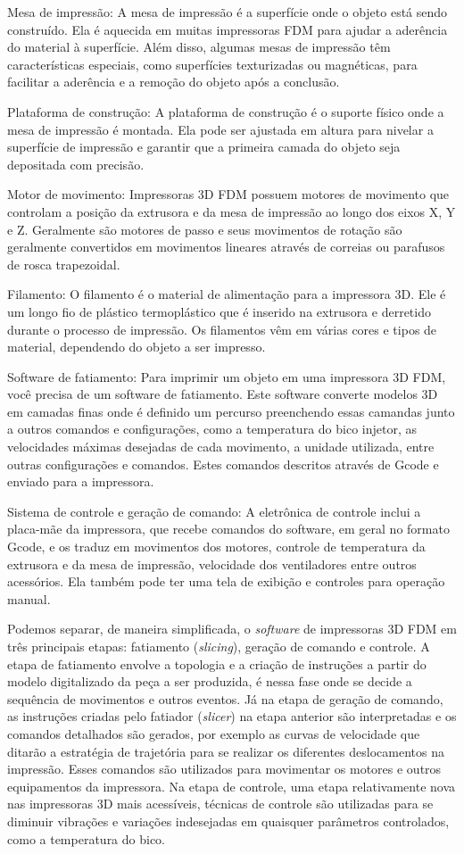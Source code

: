Mesa de impressão: A mesa de impressão é a superfície onde o objeto está sendo construído. 
Ela é aquecida em muitas impressoras FDM para ajudar a aderência do material à superfície. 
Além disso, algumas mesas de impressão têm características especiais, como superfícies 
texturizadas ou magnéticas, para facilitar a aderência e a remoção do objeto após a conclusão.

Plataforma de construção: A plataforma de construção é o suporte físico onde a mesa de impressão é montada. 
Ela pode ser ajustada em altura para nivelar a superfície de impressão e garantir que a primeira camada do 
objeto seja depositada com precisão.

Motor de movimento: Impressoras 3D FDM possuem motores de movimento que controlam a posição da extrusora e 
da mesa de impressão ao longo dos eixos X, Y e Z. Geralmente são motores de passo e seus movimentos de rotação
são geralmente convertidos em movimentos lineares através de correias ou parafusos de rosca trapezoidal.

Filamento: O filamento é o material de alimentação para a impressora 3D. Ele é um longo fio de plástico 
termoplástico que é inserido na extrusora e derretido durante o processo de impressão. Os filamentos vêm 
em várias cores e tipos de material, dependendo do objeto a ser impresso.

Software de fatiamento: Para imprimir um objeto em uma impressora 3D FDM, você precisa de um software de fatiamento. 
Este software converte modelos 3D em camadas finas onde é definido um percurso preenchendo essas camandas junto
a outros comandos e configurações, como a temperatura do bico injetor, as velocidades máximas desejadas de cada movimento,
a unidade utilizada, entre outras configurações e comandos. Estes comandos descritos através de Gcode e enviado para a impressora. 

Sistema de controle e geração de comando: A eletrônica de controle inclui a placa-mãe da impressora, que recebe comandos do 
software, em geral no formato Gcode, e os traduz em movimentos dos motores, controle de temperatura da extrusora e da mesa de impressão, 
velocidade dos ventiladores entre outros acessórios. 
Ela também pode ter uma tela de exibição e controles para operação manual.

Podemos separar, de maneira simplificada, o \textit{software} de impressoras 3D
FDM em três principais etapas: fatiamento (\textit{slicing}), geração de comando e controle.
A etapa de fatiamento envolve a topologia e a criação de instruções a partir do modelo digitalizado da peça a ser produzida,
é nessa fase onde se decide a sequência de movimentos e outros eventos.
Já na etapa de geração de comando, as instruções criadas pelo fatiador (\textit{slicer}) na etapa anterior
são interpretadas e os comandos detalhados são gerados, por exemplo as curvas de velocidade que ditarão a 
estratégia de trajetória para se realizar os diferentes deslocamentos na impressão.
Esses comandos são utilizados para movimentar os motores e outros equipamentos da impressora.
Na etapa de controle, uma etapa relativamente nova nas impressoras 3D mais acessíveis, 
técnicas de controle são utilizadas para se diminuir vibrações e variações indesejadas em quaisquer
parâmetros controlados, como a temperatura do bico.

